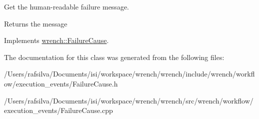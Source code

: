 Get the human-\/readable failure message. 

\begin{DoxyReturn}{Returns}
the message 
\end{DoxyReturn}


Implements \hyperlink{classwrench_1_1_failure_cause_afbad248ebe902409f2cd4f1d6f2b867d}{wrench\+::\+Failure\+Cause}.



The documentation for this class was generated from the following files\+:\begin{DoxyCompactItemize}
\item 
/\+Users/rafsilva/\+Documents/isi/workspace/wrench/wrench/include/wrench/workflow/execution\+\_\+events/Failure\+Cause.\+h\item 
/\+Users/rafsilva/\+Documents/isi/workspace/wrench/wrench/src/wrench/workflow/execution\+\_\+events/Failure\+Cause.\+cpp\end{DoxyCompactItemize}
